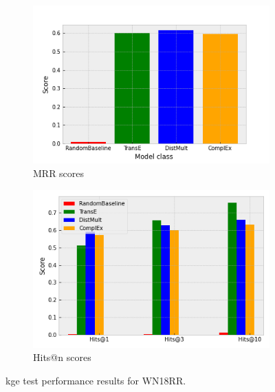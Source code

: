 \begin{figure}[htbp]
\centering
\begin{subfigure}{.5\textwidth}
  \centering
  \includegraphics[width=1\linewidth]{figures/model_selection/wn18rr_mrr.png}
  \caption{MRR scores}
  \label{fig:model_selection_mrr_wn18rr}
\end{subfigure}%
\begin{subfigure}{.5\textwidth}
  \centering
  \includegraphics[width=1\linewidth]{figures/model_selection/wn18rr_hit_scores.png}
  \caption{Hits@n scores}
  \label{fig:model_selection_hit_scores_wn18rr}
\end{subfigure}
\caption[KGE test results for WN18RR KG.]{\gls{kge} test performance results for WN18RR.}
\label{fig:model_selection_metrics_wn18rr}
\end{figure}



